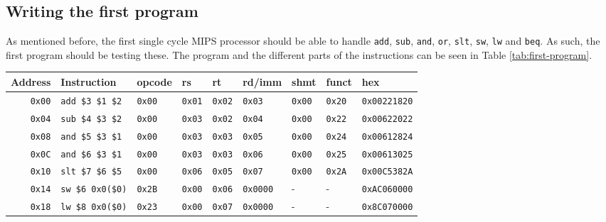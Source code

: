 \subsection{Writing the first program}
As mentioned before, the first single cycle MIPS processor should be able to
handle \texttt{add}, \texttt{sub}, \texttt{and}, \texttt{or}, \texttt{slt},
\texttt{sw}, \texttt{lw} and \texttt{beq}. As such, the first program should be
testing these. The program and the different parts of the instructions can be
seen in Table \ref{tab:first-program}.
\begin{table}
    \centering
    \begin{tabular}{rllllllll}
        \toprule
        Address & Instruction & opcode & rs & rt & rd/imm & shmt & funct & hex \\
        \midrule
        \texttt{0x00} & \texttt{add \$3 \$1 \$2} & \texttt{0x00} &
        \texttt{0x01} & \texttt{0x02} & \texttt{0x03} & \texttt{0x00} &
        \texttt{0x20} & \texttt{0x00221820} \\ %

        \texttt{0x04} & \texttt{sub \$4 \$3 \$2} & \texttt{0x00} &
        \texttt{0x03} & \texttt{0x02} & \texttt{0x04} & \texttt{0x00} &
        \texttt{0x22} & \texttt{0x00622022} \\ %

        \texttt{0x08} & \texttt{and \$5 \$3 \$1} & \texttt{0x00} &
        \texttt{0x03} & \texttt{0x03} & \texttt{0x05} & \texttt{0x00} &
        \texttt{0x24} & \texttt{0x00612824} \\ %

        \texttt{0x0C} & \texttt{and \$6 \$3 \$1} & \texttt{0x00} &
        \texttt{0x03} & \texttt{0x03} & \texttt{0x06} & \texttt{0x00} &
        \texttt{0x25} & \texttt{0x00613025} \\ %

        \texttt{0x10} & \texttt{slt \$7 \$6 \$5} & \texttt{0x00} &
        \texttt{0x06} & \texttt{0x05} & \texttt{0x07} & \texttt{0x00} &
        \texttt{0x2A} & \texttt{0x00C5382A} \\ %

        \texttt{0x14} & \texttt{sw \$6  0x0(\$0)} & \texttt{0x2B} &
        \texttt{0x00} & \texttt{0x06} & \texttt{0x0000} & - &
        - & \texttt{0xAC060000} \\ %

        \texttt{0x18} & \texttt{lw \$8  0x0(\$0)} & \texttt{0x23} &
        \texttt{0x00} & \texttt{0x07} & \texttt{0x0000} & - &
        - & \texttt{0x8C070000} \\ %


\end{tabular}
\end{table}
